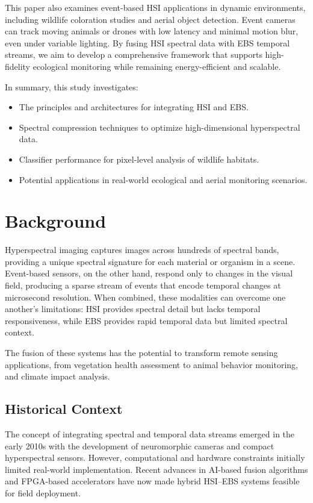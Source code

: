 \documentclass[conference]{IEEEtran}
\begin{document}
This paper also examines event-based HSI applications in dynamic environments, including wildlife coloration studies and aerial object detection. Event cameras can track moving animals or drones with low latency and minimal motion blur, even under variable lighting. By fusing HSI spectral data with EBS temporal streams, we aim to develop a comprehensive framework that supports high-fidelity ecological monitoring while remaining energy-efficient and scalable.

In summary, this study investigates:  
\begin{itemize}
    \item The principles and architectures for integrating HSI and EBS.  
    \item Spectral compression techniques to optimize high-dimensional hyperspectral data.  
    \item Classifier performance for pixel-level analysis of wildlife habitats.  
    \item Potential applications in real-world ecological and aerial monitoring scenarios.  
\end{itemize}


\section{Background}
Hyperspectral imaging captures images across hundreds of spectral bands, providing a unique spectral signature for each material or organism in a scene. Event-based sensors, on the other hand, respond only to changes in the visual field, producing a sparse stream of events that encode temporal changes at microsecond resolution. When combined, these modalities can overcome one another’s limitations: HSI provides spectral detail but lacks temporal responsiveness, while EBS provides rapid temporal data but limited spectral context.

The fusion of these systems has the potential to transform remote sensing applications, from vegetation health assessment to animal behavior monitoring, and climate impact analysis.

\subsection{Historical Context}
The concept of integrating spectral and temporal data streams emerged in the early 2010s with the development of neuromorphic cameras and compact hyperspectral sensors. However, computational and hardware constraints initially limited real-world implementation. Recent advances in AI-based fusion algorithms and FPGA-based accelerators have now made hybrid HSI–EBS systems feasible for field deployment.
\end{document}
